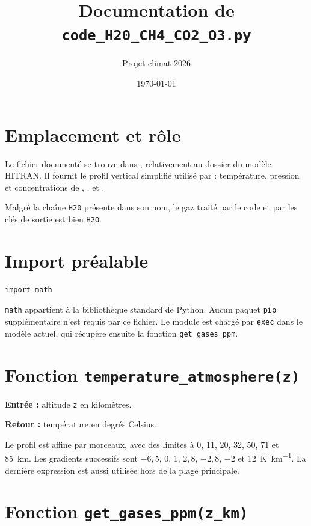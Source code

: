 \documentclass[11pt,a4paper]{article}
\title{Documentation de \texttt{code\_H20\_CH4\_CO2\_O3.py}}
\author{Projet climat 2026}
\date{\today}
\begin{document}
\maketitle
\tableofcontents

\section{Emplacement et rôle}

Le fichier documenté se trouve dans
, relativement
au dossier du modèle HITRAN. Il fournit le profil vertical simplifié utilisé
par  : température,
pression et concentrations de , ,  et .

Malgré la chaîne \texttt{H20} présente dans son nom, le gaz traité par le
code et par les clés de sortie est bien \texttt{H2O}.

\section{Import préalable}

\begin{lstlisting}
import math
\end{lstlisting}

\texttt{math} appartient à la bibliothèque standard de Python. Aucun paquet
\texttt{pip} supplémentaire n'est requis par ce fichier. Le module est chargé
par \texttt{exec} dans le modèle actuel, qui récupère ensuite la fonction
\texttt{get\_gases\_ppm}.

\section{Fonction \texttt{temperature\_atmosphere(z)}}

\textbf{Entrée :} altitude \texttt{z} en kilomètres.

\textbf{Retour :} température en degrés Celsius.

Le profil est affine par morceaux, avec des limites à 0, 11, 20, 32, 50,
71 et \SI{85}{\kilo\metre}. Les gradients successifs sont $-6{,}5$, 0, 1,
$2{,}8$, $-2{,}8$, $-2$ et \SI{12}{\kelvin\per\kilo\metre}. La dernière
expression est aussi utilisée hors de la plage principale.

\section{Fonction \texttt{get\_gases\_ppm(z\_km)}}
\end{document}
